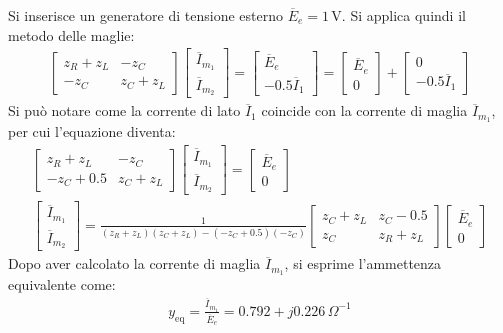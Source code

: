 \documentclass{article}
\newcommand{\SI}[1]{\,\mathrm{#1}}
\begin{document}
Si inserisce un generatore di tensione esterno $\overline{E}_e=1\SI{V}$. 
Si applica quindi il metodo delle maglie:
\begin{gather*}
    \begin{bmatrix}
        z_R+z_L&-z_C\\-z_C&z_C+z_L
    \end{bmatrix}\begin{bmatrix}
        \overline{I}_{m_1}\\\overline{I}_{m_2}
    \end{bmatrix}=\begin{bmatrix}
        \overline{E}_e\\-0.5\overline{I}_1
    \end{bmatrix}=\begin{bmatrix}
        \overline{E}_e\\0
    \end{bmatrix}+\begin{bmatrix}
        0\\-0.5\overline{I}_1
    \end{bmatrix}
\end{gather*}
Si può notare come la corrente di lato $\overline{I}_1$ coincide con la corrente di maglia $\overline{I}_{m_1}$, per cui l'equazione diventa:
\begin{gather*}
    \begin{bmatrix}
        z_R+z_L&-z_C\\-z_C+0.5&z_C+z_L
    \end{bmatrix}\begin{bmatrix}
        \overline{I}_{m_1}\\\overline{I}_{m_2}
    \end{bmatrix}=\begin{bmatrix}
        \overline{E}_e\\0
    \end{bmatrix}\\
    \begin{bmatrix}
        \overline{I}_{m_1}\\\overline{I}_{m_2}
    \end{bmatrix}=\displaystyle\frac{1}{(z_R+z_L)(z_C+z_L)-(-z_C+0.5)(-z_C)}\begin{bmatrix}
        z_C+z_L&z_C-0.5\\z_C&z_R+z_L
    \end{bmatrix}\begin{bmatrix}
        \overline{E}_e\\0
    \end{bmatrix}
\end{gather*}
Dopo aver calcolato la corrente di maglia $\overline{I}_{m_1}$, si esprime l'ammettenza equivalente come:
\begin{gather}
    y_\mathrm{eq}=\displaystyle\frac{\overline{I}_{m_1}}{\overline{E}_e}=0.792+j0.226\,\Omega^{-1}
\end{gather}
\end{document}
